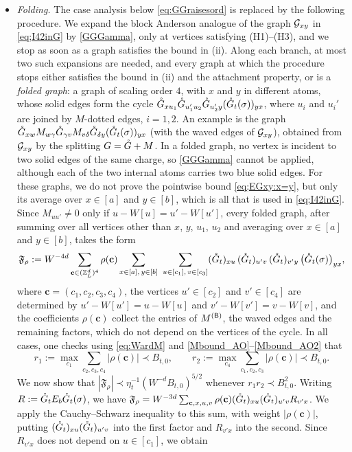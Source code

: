\begin{itemize}
\item[(iii)] \emph{Folding.} The case analysis below \eqref{eq:GGraisesord} is replaced by the following procedure. We expand the block Anderson analogue of the graph $\cal G_{xy}$ in \eqref{eq;I42inG} by \eqref{GGGamma}, only at vertices satisfying (H1)--(H3), and we stop as soon as a graph satisfies the bound in (ii). Along each branch, at most two such expansions are needed, and every graph at which the procedure stops either satisfies the bound in (ii) and the attachment property, or is a \emph{folded graph}: a graph of scaling order $4$, with $x$ and $y$ in different atoms, whose solid edges form the cycle $\Gc_{xu_1}\Gc_{u_1'u_2}\Gc_{u_2'y}(\Gc_t(\sig))_{yx}$, where $u_i$ and $u_i'$ are joined by $M$-dotted edges, $i=1,2$. An example is the graph $\Gc_{xw}M_{w\gamma}\Gc_{\gamma v}M_{v\delta}\Gc_{\delta y}(\Gc_t(\sig))_{yx}$ (with the waved edges of $\cal G_{xy}$), obtained from $\cal G_{xy}$ by the splitting $G=\Gc+M$. In a folded graph, no vertex is incident to two solid edges of the same charge, so \eqref{GGGamma} cannot be applied, although each of the two internal atoms carries two blue solid edges. For these graphs, we do not prove the pointwise bound \eqref{eq;EGxy:x=y}, but only its average over $x\in[a]$ and $y\in[b]$, which is all that is used in \eqref{eq;I42inG}. Since $M_{uu'}\ne0$ only if $u-W[u]=u'-W[u']$, every folded graph, after summing over all vertices other than $x$, $y$, $u_1$, $u_2$ and averaging over $x\in[a]$ and $y\in[b]$, takes the form
\[ \mathfrak F_\rho:=W^{-4d}\sum_{\mathbf c\in(\Zn)^4}\rho(\mathbf c)\sum_{x\in[a],\,y\in[b]}\ \sum_{u\in[c_1],\,v\in[c_3]}(\Gc_t)_{xu}\,(\Gc_t)_{u'v}\,(\Gc_t)_{v'y}\,\big(\Gc_t(\sig)\big)_{yx}, \]
where $\mathbf c=(c_1,c_2,c_3,c_4)$, the vertices $u'\in[c_2]$ and $v'\in[c_4]$ are determined by $u'-W[u']=u-W[u]$ and $v'-W[v']=v-W[v]$, and the coefficients $\rho(\mathbf c)$ collect the entries of $M^{(\sB)}$, the waved edges and the remaining factors, which do not depend on the vertices of the cycle. In all cases, one checks using \eqref{eq:WardM} and \eqref{Mbound_AO}--\eqref{Mbound_AO2} that
\[ r_1:=\max_{c_1}\sum_{c_2,c_3,c_4}|\rho(\mathbf c)|\prec B_{t,0},\qquad r_2:=\max_{c_4}\sum_{c_1,c_2,c_3}|\rho(\mathbf c)|\prec B_{t,0}. \]
We now show that $|\mathfrak F_\rho|\prec \eta_t^{-1}(W^{-d}B_{t,0})^{5/2}$ whenever $r_1r_2\prec B_{t,0}^2$. Writing $R:=\Gc_tE_b\Gc_t(\sig)$, we have $\mathfrak F_\rho=W^{-3d}\sum_{\mathbf c,x,u,v}\rho(\mathbf c)(\Gc_t)_{xu}(\Gc_t)_{u'v}R_{v'x}$. We apply the Cauchy--Schwarz inequality to this sum, with weight $|\rho(\mathbf c)|$, putting $(\Gc_t)_{xu}(\Gc_t)_{u'v}$ into the first factor and $R_{v'x}$ into the second. Since $R_{v'x}$ does not depend on $u\in[c_1]$, we obtain

\end{itemize}
